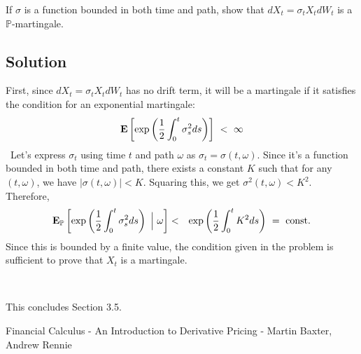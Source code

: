 \documentclass[uplatex,a4j,12pt,dvipdfmx]{jsarticle}
\begin{document}
If $\sigma$ is a function bounded in both time and path, show that $dX_{t} = \sigma_{t} X_{t} dW_{t}$ is a $\mathbb{P}$-martingale.
\subsection{Solution}

First, since $dX_{t} = \sigma_{t} X_{t} dW_{t}$ has no drift term, it will be a martingale if it satisfies the condition for an exponential martingale:
$$
	{\bf E}
	\left[
		\exp
		\left(
		\dfrac{1}{2}
		\int^{t}_{0} \sigma_{s}^{2} ds
		\right)
		\right]
	\ < \
	\infty
$$
\
Let's express $\sigma_{t}$ using time $t$ and path $\omega$ as $\sigma_{t}=\sigma(t,\omega)$. Since it's a function bounded in both time and path, there exists a constant $K$ such that for any $(t,\omega)$, we have $|\sigma(t,\omega)| < K$.
Squaring this, we get $\sigma^{2}(t,\omega) < K^{2}$.
Therefore,
%
\begin{eqnarray*}
	{\bf E}_{\mathbb{P}}
	\left[
		\exp
		\left(
		\dfrac{1}{2}
		\int^{t}_{0} \sigma_{s}^{2} ds
		\right)
		\
		\Big|
		\
		\omega
		\right]
	&<&
	\exp
	\left(
	\dfrac{1}{2}
	\int^{t}_{0} K^{2} ds
	\right)
	\ = \
	{\rm const.}
\end{eqnarray*}
%
Since this is bounded by a finite value, the condition given in the problem is sufficient to prove that $X_{t}$ is a martingale.

\
\

This concludes Section 3.5.

\begin{thebibliography}{9}
	Financial Calculus - An Introduction to Derivative Pricing - Martin Baxter, Andrew Rennie
\end{thebibliography}
\end{document}

